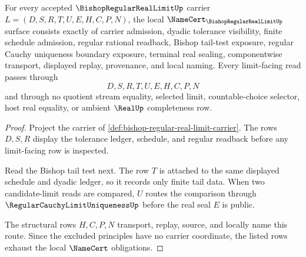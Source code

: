 \begin{theorem}
\label{thm:bishop-regular-real-limit-namecert-obligations}
For every accepted $\BishopRegularRealLimitUp$ carrier $L=(D,S,R,T,U,E,H,C,P,N)$, the local $\NameCert_{\BishopRegularRealLimitUp}$ surface consists exactly of carrier admission, dyadic tolerance visibility, finite schedule admission, regular rational readback, Bishop tail-test exposure, regular Cauchy uniqueness boundary exposure, terminal real sealing, componentwise transport, displayed replay, provenance, and local naming. Every limit-facing read passes through
$$
D,S,R,T,U,E,H,C,P,N
$$
and through no quotient stream equality, selected limit, countable-choice selector, host real equality, or ambient $\RealUp$ completeness row.
\end{theorem}
\begin{proof}
Project the carrier of \autoref{def:bishop-regular-real-limit-carrier}. The rows $D,S,R$ display the tolerance ledger, schedule, and regular readback before any limit-facing row is inspected.

Read the Bishop tail test next. The row $T$ is attached to the same displayed schedule and dyadic ledger, so it records only finite tail data. When two candidate-limit reads are compared, $U$ routes the comparison through $\RegularCauchyLimitUniquenessUp$ before the real seal $E$ is public.

The structural rows $H,C,P,N$ transport, replay, source, and locally name this route. Since the excluded principles have no carrier coordinate, the listed rows exhaust the local $\NameCert$ obligations.
\end{proof}

